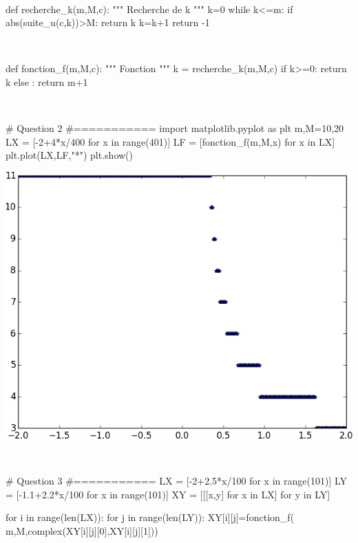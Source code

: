 \documentclass[10pt,fleqn]{article} %
\begin{document}
\begin{multicols}{2}
\begin{corrige}
$\quad$
\begin{python}
def recherche_k(m,M,c):
    """ Recherche de k """
    k=0
    while k<=m:
        if abs(suite_u(c,k))>M:
            return k
        k=k+1
    return -1
\end{python}
\end{corrige}

\begin{corrige}
$\quad$
\begin{python}
def fonction_f(m,M,c):
    """ Fonction """
    k = recherche_k(m,M,c)
    if k>=0:
        return k
    else :
        return m+1
\end{python}
\end{corrige}

\begin{corrige}
$\quad$
\begin{python}
# Question 2
#===========
import matplotlib.pyplot as plt
m,M=10,20
LX = [-2+4*x/400 for x in range(401)]
LF = [fonction_f(m,M,x) for x in LX]
plt.plot(LX,LF,"*")
plt.show()
\end{python}
\end{corrige}
\begin{center}
\includegraphics[width=.8\linewidth]{programmes/Exercice_09/figure_1}
\end{center}
\begin{corrige}
$\quad$
\begin{python}
# Question 3
#===========
LX = [-2+2.5*x/100 for x in range(101)]
LY = [-1.1+2.2*x/100 for x in range(101)]
XY = [[[x,y] for x in LX] for y in LY]

for i in range(len(LX)):
    for j in range(len(LY)):
        XY[i][j]=fonction_f(
            m,M,complex(XY[i][j][0],XY[i][j][1]))
\end{python}
\end{corrige}


\end{multicols}
\end{document}
